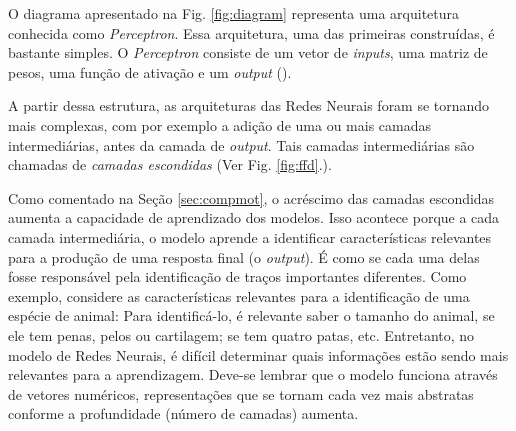 
 O diagrama apresentado na Fig. \ref{fig:diagram} representa uma arquitetura conhecida como \textit{Perceptron}. Essa arquitetura, uma das primeiras construídas, é bastante simples. O \textit{Perceptron} consiste de um vetor de \textit{inputs}, uma matriz de pesos, uma função de ativação e um \textit{output} (\cite{Rosenblatt:1957}). 
 
 A partir dessa estrutura, as arquiteturas das Redes Neurais foram se tornando mais complexas, com por exemplo a adição de uma ou mais camadas intermediárias, antes da camada de \textit{output}. Tais camadas intermediárias são chamadas de \textit{camadas escondidas} (Ver Fig. \ref{fig:ffd}.).






Como comentado na Seção \ref{sec:compmot}, o acréscimo das camadas escondidas aumenta a capacidade de aprendizado dos modelos. Isso acontece porque a cada camada intermediária, o modelo aprende a identificar características relevantes para a produção de uma resposta final (o \textit{output}). É como se cada uma delas fosse responsável pela identificação de traços importantes diferentes. Como exemplo, considere as características relevantes para a identificação de uma espécie de animal: Para identificá-lo, é relevante saber o tamanho do animal, se ele tem penas, pelos ou cartilagem; se tem quatro patas, etc.  
Entretanto, no modelo de Redes Neurais, é difícil determinar quais informações estão sendo mais relevantes para a aprendizagem. Deve-se lembrar que o modelo funciona através de vetores numéricos, representações que se tornam cada vez mais abstratas conforme a profundidade (número de camadas) aumenta.

